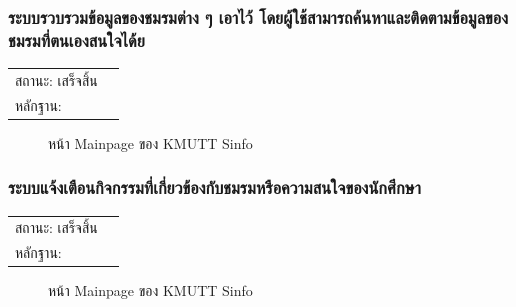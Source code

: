 \documentclass[14pt,oneside,openright,a4paper]{cpe-thai-project}
\begin{document}
\subsubsection{ระบบรวบรวมข้อมูลของชมรมต่าง ๆ เอาไว้ โดยผู้ใช้สามารถค้นหาและติดตามข้อมูลของชมรมที่ตนเองสนใจได้ย}
\begin{tabular}{@{}p{2cm}p{10cm}@{}}
  สถานะ: เสร็จสิ้น \\
  หลักฐาน: & \\
  \end{tabular}
\begin{figure}[!h]\centering
  \setlength{\fboxrule}{0.5mm} %
  \setlength{\fboxsep}{0.5cm}
  \caption{หน้า Mainpage ของ KMUTT Sinfo}\label{fig:sinfo}
\end{figure}
\newpage
\subsubsection{ระบบแจ้งเตือนกิจกรรมที่เกี่ยวข้องกับชมรมหรือความสนใจของนักศึกษา}
\begin{tabular}{@{}p{2cm}p{10cm}@{}}
  สถานะ: เสร็จสิ้น \\
  หลักฐาน: & \\
  \end{tabular}
\begin{figure}[!h]\centering
  \setlength{\fboxrule}{0.5mm} %
  \setlength{\fboxsep}{0.5cm}
  \caption{หน้า Mainpage ของ KMUTT Sinfo}\label{fig:sinfo}
\end{figure}
\newpage
\end{document}
